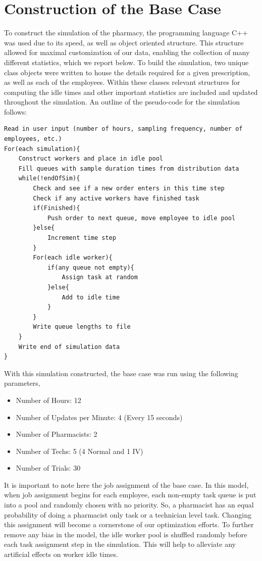\documentclass[10pt]{report}            %
\begin{document}
\section*{Construction of the Base Case}
To construct the simulation of the pharmacy, the programming language C++ was used due to its speed, as well as object oriented structure. This structure allowed for maximal customization of our data, enabling the collection of many different statistics, which we report below. To build the simulation, two unique class objects were written to house the details required for a given prescription, as well as each of the employees. Within these classes relevant structures for computing the idle times and other important statistics are included and updated throughout the simulation. An outline of the pseudo-code for the simulation follows:
\begin{verbatim}
Read in user input (number of hours, sampling frequency, number of employees, etc.)
For(each simulation){
    Construct workers and place in idle pool
    Fill queues with sample duration times from distribution data
    while(!endOfSim){
        Check and see if a new order enters in this time step
        Check if any active workers have finished task
        if(Finished){
            Push order to next queue, move employee to idle pool
        }else{
            Increment time step
        }
        For(each idle worker){
            if(any queue not empty){
                Assign task at random                   
            }else{
                Add to idle time
            }
        }
        Write queue lengths to file
    }
    Write end of simulation data
}
\end{verbatim}
With this simulation constructed, the base case was run using the following parameters,
\begin{itemize}
\item Number of Hours: 12
\item Number of Updates per Minute: 4 (Every 15 seconds)
\item Number of Pharmacists: 2
\item Number of Techs: 5 (4 Normal and 1 IV)
\item Number of Trials: 30
\end{itemize}
It is important to note here the job assignment of the base case. In this model, when job assignment begins for each employee, each non-empty task queue is put into a pool and randomly chosen with no priority. So, a pharmacist has an equal probability of doing a pharmacist only task or a technician level task. Changing this assignment will become a cornerstone of our optimization efforts. To further remove any bias in the model, the idle worker pool is shuffled randomly before each task assignment step in the simulation. This will help to alleviate any artificial effects on worker idle times.
\end{document}
